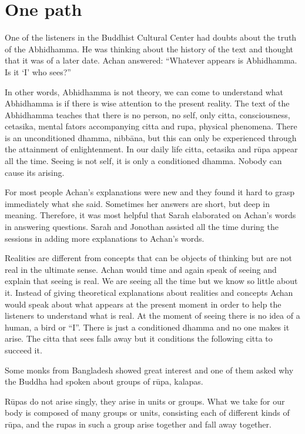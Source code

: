 \chapter{One path}

One of the listeners in the Buddhist Cultural Center had doubts about the truth of the 
Abhidhamma. He was thinking about the history of the text and thought that it was of 
a later date.  Achan answered: ``Whatever appears is Abhidhamma. Is it `I' who 
sees?'' 

In other words, Abhidhamma is not theory, we can come to understand what Abhidhamma is if there is wise attention to the present reality. The text of the Abhidhamma teaches that there is no person, no self, only citta, consciousness, cetasika, 
mental fators accompanying citta and rupa, physical phenomena. There is an unconditioned dhamma, nibbāna, but this can only be experienced through the attainment 
of enlightenment. In our daily life citta, cetasika and rūpa appear all the time. Seeing 
is not self, it is only a conditioned dhamma. Nobody can cause its arising. 

For most people Achan’s explanations were new and they found it hard to grasp immediately what she said. Sometimes her answers are short, but deep in meaning. 
Therefore, it was most helpful that Sarah elaborated on  Achan’s words in answering 
questions. Sarah and Jonothan assisted all the time during the sessions in adding more 
explanations to  Achan’s words. 

Realities are different from concepts that can be objects of thinking but are not real in 
the ultimate sense.  Achan would time and again speak of seeing and explain that 
seeing is real. We are seeing all the time but we know so little about it. Instead of giving theoretical explanations about realities and concepts Achan would speak about 
what appears at the present moment in order to help the listeners to understand what 
is real. At the moment of seeing there is no idea of a human, a bird or ``I''. There is 
just a conditioned dhamma and no one makes it arise. The citta that sees falls away 
but it conditions the following citta to succeed it. 

Some monks from Bangladesh showed great interest and one of them asked why the 
Buddha had spoken about groups of rūpa, kalapas. 

Rūpas do not arise singly, they arise in units or groups. What we take for our body is 
composed of many groups or units, consisting each of different kinds of rūpa, and the 
rupas in such a group arise together and fall away together. 

